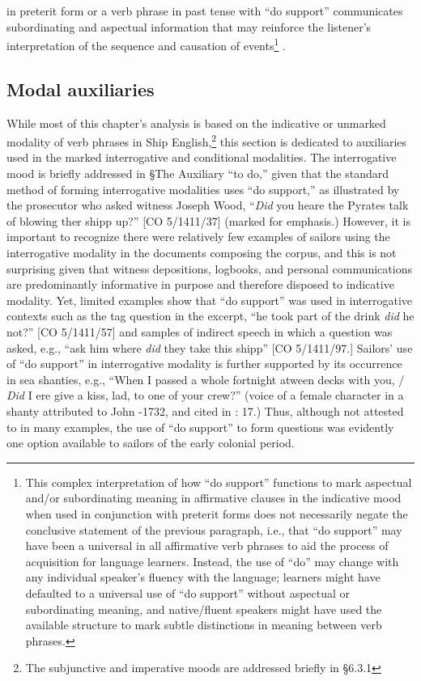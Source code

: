 in preterit form or a verb phrase in past tense with “do support” communicates subordinating and aspectual information that may reinforce the listener’s interpretation of the sequence and causation of events\footnote{This complex interpretation of how “do support” functions to mark aspectual and/or subordinating meaning in affirmative clauses in the indicative mood when used in conjunction with preterit forms does not necessarily negate the conclusive statement of the previous paragraph, i.e., that “do support” may have been a universal in all affirmative verb phrases to aid the process of acquisition for language learners. Instead, the use of “do” may change with any individual speaker’s fluency with the language; learners might have defaulted to a universal use of “do support” without aspectual or subordinating meaning, and native/fluent speakers might have used the available structure to mark subtle distinctions in meaning between verb phrases.} .  

\subsection{{Modal} {auxiliaries}}%

  While most of this chapter’s analysis is based on the indicative or unmarked modality of verb phrases in Ship English,\footnote{The subjunctive and imperative moods are addressed briefly in §6.3.1} this section is dedicated to auxiliaries used in the marked interrogative and conditional modalities. The interrogative mood is briefly addressed in §The Auxiliary “to do,” given that the standard method of forming interrogative modalities uses “do support,” as illustrated by the prosecutor who asked witness Joseph Wood, “\textit{Did} you heare the Pyrates talk of blowing ther shipp up?” [CO 5/1411/37] (marked for emphasis.) However, it is important to recognize there were relatively few examples of sailors using the interrogative modality in the documents composing the corpus, and this is not surprising given that witness depositions, logbooks, and personal communications are predominantly informative in purpose and therefore disposed to indicative modality. Yet, limited examples show that “do support” was used in interrogative contexts such as the tag question in the excerpt, “he took part of the drink \textit{did} he not?” [CO 5/1411/57] and samples of indirect speech in which a question was asked, e.g., “ask him where \textit{did} they take this shipp” [CO 5/1411/97.] Sailors’ use of “do support” in interrogative modality is further supported by its occurrence in sea shanties, e.g., “When I passed a whole fortnight atween decks with you, / \textit{Did} I ere give a kiss, lad, to one of your crew?” (voice of a female character in a shanty attributed to John \citealt{Gay1685}-1732, and cited in \citealt{Hugill1969}: 17.) Thus, although not attested to in many examples, the use of “do support” to form questions was evidently one option available to sailors of the early colonial period.   

